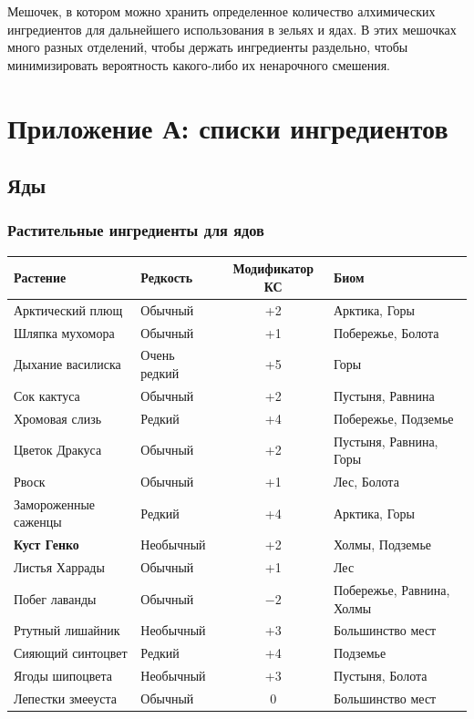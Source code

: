 \documentclass[a4paper, 9pt, twocolumn]{book}
\begin{document}
	Мешочек, в котором можно хранить определенное количество алхимических ингредиентов для дальнейшего использования в зельях и ядах. В этих мешочках много разных отделений, чтобы держать ингредиенты раздельно, чтобы минимизировать вероятность какого-либо их ненарочного смешения.
	
	\chapter{Приложение А: списки ингредиентов}
	
	\section{Яды}
	
	\subsection{Растительные ингредиенты для ядов}
	
	\begin{tabular}{|l|l|c|l|}
		\hline
		\textbf{Растение} & \textbf{Редкость} & \textbf{Модификатор КС} & \textbf{Биом} \\
		\hline
		Арктический плющ & Обычный & +2 & Арктика, Горы \\
		\hline
		Шляпка мухомора & Обычный & +1 & Побережье, Болота \\
		\hline
		Дыхание василиска & Очень редкий & +5 & Горы \\
		\hline
		Сок кактуса & Обычный & +2 & Пустыня, Равнина \\
		\hline
		Хромовая слизь & Редкий & +4 & Побережье, Подземье \\
		\hline
		Цветок Дракуса & Обычный & +2 & Пустыня, Равнина, Горы \\
		\hline
		Рвоск & Обычный & +1 & Лес, Болота \\
		\hline
		Замороженные саженцы & Редкий & +4 & Арктика, Горы \\
		\hline
		\textbf{Куст Генко} & Необычный & +2 & Холмы, Подземье \\
		\hline
		Листья Харрады & Обычный & +1 & Лес \\
		\hline
		Побег лаванды & Обычный & $-2$ & Побережье, Равнина, Холмы \\
		\hline
		Ртутный лишайник & Необычный & +3 & Большинство мест \\
		\hline
		Сияющий синтоцвет & Редкий & +4 & Подземье \\
		\hline
		Ягоды шипоцвета & Необычный & +3 & Пустыня, Болота \\
		\hline
		Лепестки змееуста & Обычный & 0 & Большинство мест \\
		\hline
	\end{tabular}
	
\end{document}
